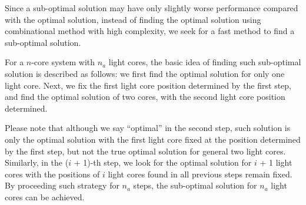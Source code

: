 Since a sub-optimal solution may have only slightly worse performance compared with the optimal solution, instead of finding the optimal solution using combinational method with high complexity, we seek for a fast method to find a sub-optimal solution.

For a $n$-core system with $n_{a}$ light cores, the basic idea of finding such sub-optimal solution is described as follows: we first find the optimal solution for only one light core. Next, we fix the first light core position determined by the first step, and find the optimal solution of two cores, with the second light core position determined. 

Please note that although we say “optimal” in the second step, such solution is only the optimal solution with the first light core fixed at the position determined by the first step, but not the true optimal solution for general two light cores. Similarly, in the ($i$ + 1)-th step, we look for the optimal solution for $i$ + 1 light cores with the positions of $i$ light cores found in all previous steps remain fixed. By proceeding such strategy for $n_{a}$ steps, the sub-optimal solution for $n_{a}$ light cores can be achieved.
